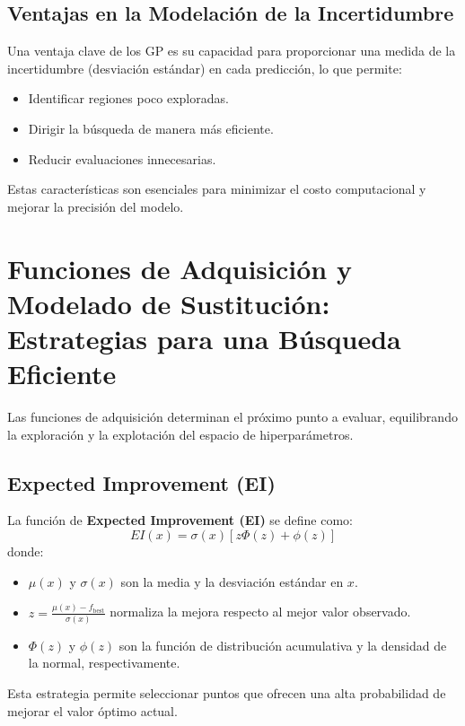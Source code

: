 \documentclass[12pt]{article}
\begin{document}
	\subsection{Ventajas en la Modelación de la Incertidumbre}
	Una ventaja clave de los GP es su capacidad para proporcionar una medida de la incertidumbre (desviación estándar) en cada predicción, lo que permite:
	\begin{itemize}[leftmargin=1.5cm]
		\item Identificar regiones poco exploradas.
		\item Dirigir la búsqueda de manera más eficiente.
		\item Reducir evaluaciones innecesarias.
	\end{itemize}
	Estas características son esenciales para minimizar el costo computacional y mejorar la precisión del modelo.  
	\lipsum[13]
	
	\section{Funciones de Adquisición y Modelado de Sustitución: Estrategias para una Búsqueda Eficiente}
	Las funciones de adquisición determinan el próximo punto a evaluar, equilibrando la exploración y la explotación del espacio de hiperparámetros.
	
	\subsection{Expected Improvement (EI)}
	La función de \textbf{Expected Improvement (EI)} se define como:
	\[
	EI(x) = \sigma(x)\left[z\Phi(z) + \phi(z)\right]
	\]
	donde:
	\begin{itemize}[leftmargin=1.5cm]
		\item \(\mu(x)\) y \(\sigma(x)\) son la media y la desviación estándar en \(x\).
		\item \(z = \frac{\mu(x) - f_{\text{best}}}{\sigma(x)}\) normaliza la mejora respecto al mejor valor observado.
		\item \(\Phi(z)\) y \(\phi(z)\) son la función de distribución acumulativa y la densidad de la normal, respectivamente.
	\end{itemize}
	Esta estrategia permite seleccionar puntos que ofrecen una alta probabilidad de mejorar el valor óptimo actual.  
	\lipsum[14]
	
\end{document}
